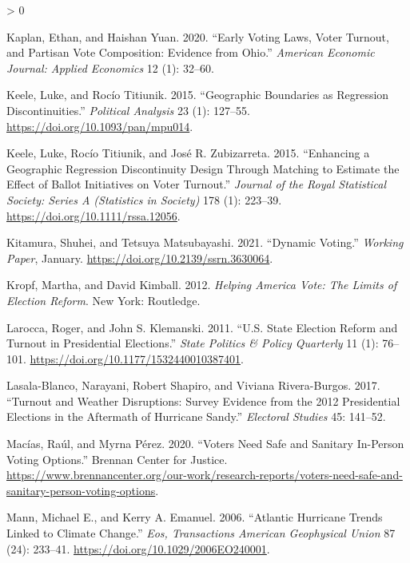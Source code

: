 \documentclass[
  12pt,
]{article}
\newlength{\cslhangindent}
\newenvironment{CSLReferences}[2] %
 {%
  \setlength{\parindent}{0pt}
  \ifodd #1 \everypar{\setlength{\hangindent}{\cslhangindent}}\ignorespaces\fi
  \ifnum #2 > 0
  \setlength{\parskip}{#2\baselineskip}
  \fi
 }%
 {}
\begin{document}
\begin{CSLReferences}{1}{0}
\leavevmode\hypertarget{ref-Kaplan2020}{}%
Kaplan, Ethan, and Haishan Yuan. 2020. {``Early {Voting Laws}, {Voter Turnout}, and {Partisan Vote Composition}: Evidence from {Ohio}.''} \emph{American Economic Journal: Applied Economics} 12 (1): 32--60.

\leavevmode\hypertarget{ref-Keele2015}{}%
Keele, Luke, and Rocío Titiunik. 2015. {``Geographic {Boundaries} as {Regression Discontinuities}.''} \emph{Political Analysis} 23 (1): 127--55. \url{https://doi.org/10.1093/pan/mpu014}.

\leavevmode\hypertarget{ref-Keele2015a}{}%
Keele, Luke, Rocío Titiunik, and José R. Zubizarreta. 2015. {``Enhancing a Geographic Regression Discontinuity Design Through Matching to Estimate the Effect of Ballot Initiatives on Voter Turnout.''} \emph{Journal of the Royal Statistical Society: Series A (Statistics in Society)} 178 (1): 223--39. \url{https://doi.org/10.1111/rssa.12056}.

\leavevmode\hypertarget{ref-Kitamura2021}{}%
Kitamura, Shuhei, and Tetsuya Matsubayashi. 2021. {``Dynamic {Voting}.''} \emph{Working Paper}, January. \url{https://doi.org/10.2139/ssrn.3630064}.

\leavevmode\hypertarget{ref-Kropf2012}{}%
Kropf, Martha, and David Kimball. 2012. \emph{Helping {America Vote}: The {Limits} of {Election Reform}}. {New York}: {Routledge}.

\leavevmode\hypertarget{ref-Larocca2011}{}%
Larocca, Roger, and John S. Klemanski. 2011. {``U.{S}. {State Election Reform} and {Turnout} in {Presidential Elections}.''} \emph{State Politics \& Policy Quarterly} 11 (1): 76--101. \url{https://doi.org/10.1177/1532440010387401}.

\leavevmode\hypertarget{ref-Lasala-Blanco2017}{}%
Lasala-Blanco, Narayani, Robert Shapiro, and Viviana Rivera-Burgos. 2017. {``Turnout and {Weather Disruptions}: Survey {Evidence} from the 2012 {Presidential Elections} in the {Aftermath} of {Hurricane Sandy}.''} \emph{Electoral Studies} 45: 141--52.

\leavevmode\hypertarget{ref-Macias2020}{}%
Macías, Raúl, and Myrna Pérez. 2020. {``Voters {Need Safe} and {Sanitary In}-{Person Voting Options}.''} {Brennan Center for Justice}. \url{https://www.brennancenter.org/our-work/research-reports/voters-need-safe-and-sanitary-person-voting-options}.

\leavevmode\hypertarget{ref-Mann2006}{}%
Mann, Michael E., and Kerry A. Emanuel. 2006. {``Atlantic Hurricane Trends Linked to Climate Change.''} \emph{Eos, Transactions American Geophysical Union} 87 (24): 233--41. \url{https://doi.org/10.1029/2006EO240001}.


\end{CSLReferences}
\end{document}
